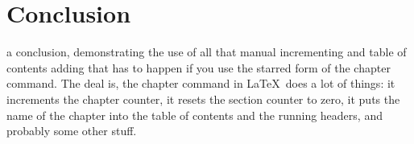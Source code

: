 \chapter*{Conclusion}

 a conclusion, demonstrating the use of all that manual incrementing and table of contents adding that has to happen if you use the starred form of the chapter command. The deal is, the chapter command in \LaTeX\ does a lot of things: it increments the chapter counter, it resets the section counter to zero, it puts the name of the chapter into the table of contents and the running headers, and probably some other stuff. 
